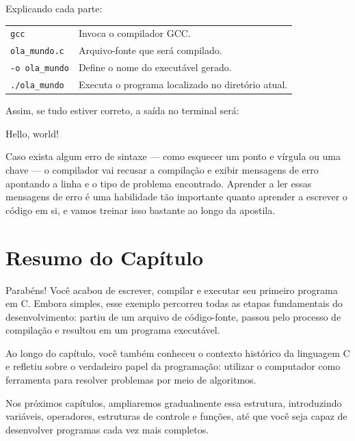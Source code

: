 \documentclass[12pt,a4paper,oneside]{extreport}
\begin{document}
Explicando cada parte:

\begin{tabular}{p{4.4cm}p{10cm}}
\texttt{gcc} & Invoca o compilador GCC.\\[0.2cm]

\texttt{ola\_mundo.c} &
Arquivo-fonte que será compilado.\\[0.2cm]

\texttt{-o ola\_mundo} &
Define o nome do executável gerado.\\[0.2cm]

\texttt{./ola\_mundo} &
Executa o programa localizado no diretório atual.
\end{tabular}


Assim, se tudo estiver correto, a saída no terminal será:

\begin{terminal}
Hello, world!
\end{terminal}

Caso exista algum erro de sintaxe — como esquecer um ponto e vírgula ou uma chave — o compilador vai recusar a compilação e exibir mensagens de erro apontando a linha e o tipo de problema encontrado. Aprender a ler essas mensagens de erro é uma habilidade tão importante quanto aprender a escrever o código em si, e vamos treinar isso bastante ao longo da apostila.


\section*{Resumo do Capítulo}

Parabéns! Você acabou de escrever, compilar e executar seu primeiro programa em C. Embora simples, esse exemplo percorreu todas as etapas fundamentais do desenvolvimento: partiu de um arquivo de código-fonte, passou pelo processo de compilação e resultou em um programa executável.

Ao longo do capítulo, você também conheceu o contexto histórico da linguagem C e refletiu sobre o verdadeiro papel da programação: utilizar o computador como ferramenta para resolver problemas por meio de algoritmos.

Nos próximos capítulos, ampliaremos gradualmente essa estrutura, introduzindo variáveis, operadores, estruturas de controle e funções, até que você seja capaz de desenvolver programas cada vez mais completos.
\end{document}

